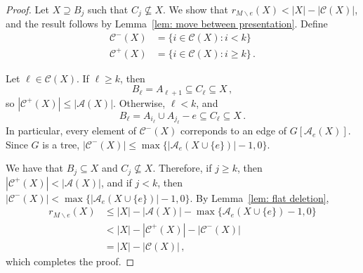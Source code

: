 \documentclass[11pt, reqno]{amsart}
\begin{document}
\begin{proof}	
Let $X \supseteq B_j$ such that $C_j \not\subseteq X$. We show that $r_{M \backslash e}(X) < |X| - |\mathcal C(X)|$, and the result follows by Lemma~\ref{lem: move between presentation}. Define
\begin{align*}
	\mathcal C^-(X) &= \{i \in \mathcal C(X) : i < k\} \\
	\mathcal C^+(X) &= \{i \in \mathcal C(X) : i \geq k\} \,.
\end{align*}

Let $\ell \in \mathcal C(X)$. If $\ell \geq k$, then
$$
B_\ell = A_{\ell + 1} \subseteq C_{\ell} \subseteq X \,,
$$
so $|\mathcal C^+(X)| \leq |\mathcal A(X)|$. Otherwise, $\ell < k$, and
$$
B_\ell = A_{i_\ell} \cup A_{j_\ell} - e \subseteq C_\ell \subseteq X \,.
$$
In particular, every element of $\mathcal C^-(X)$ correponds to an edge of $G[\mathcal A_e(X)]$. Since $G$ is a tree, $|\mathcal C^-(X)| \leq \max\{|\mathcal A_e(X \cup \{e\})| - 1, 0\}$.

We have that $B_j \subseteq X$ and $C_j \not\subseteq X$. Therefore, if $j \geq k$, then $|\mathcal C^+(X)| < |\mathcal A(X)|$, and if $j < k$, then $|\mathcal C^-(X)| < \max\{|\mathcal A_e(X \cup \{e\})| - 1, 0\}$. By Lemma~\ref{lem: flat deletion},
\begin{align*}
	r_{M \backslash e}(X) &\leq |X| - |\mathcal A(X)| - \max\{\mathcal A_e(X \cup \{e\}) - 1, 0\} \\
	&< |X| - |\mathcal C^+(X)| - |\mathcal C^-(X)| \\
	&= |X| - |\mathcal C(X)| \,,
\end{align*}
which completes the proof.
\end{proof}
\end{document}
